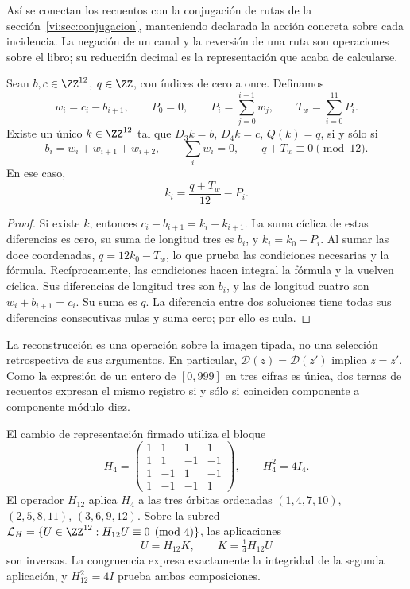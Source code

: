 Así se conectan los recuentos con la conjugación de rutas de la
sección~\ref{vi:sec:conjugacion}, manteniendo declarada la acción
concreta sobre cada incidencia. La negación de un canal y la reversión
de una ruta son operaciones sobre el libro; su reducción decimal es la
representación que acaba de calcularse.

\begin{proposition}
\label{vi:dep:imagen-integral}
Sean \(b,c\in\ZZ^{12}\), \(q\in\ZZ\), con índices de cero a once.
Definamos
\[
 w_i=c_i-b_{i+1},\qquad P_0=0,\qquad
 P_i=\sum_{j=0}^{i-1}w_j,\qquad T_w=\sum_{i=0}^{11}P_i.
\]
Existe un único \(k\in\ZZ^{12}\) tal que
\(D_3k=b\), \(D_4k=c\), \(Q(k)=q\), si y sólo si
\begin{equation}
 b_i=w_i+w_{i+1}+w_{i+2},\qquad
 \sum_iw_i=0,\qquad q+T_w\equiv0\pmod{12}.
 \label{vi:dep:condiciones-imagen}
\end{equation}
En ese caso,
\begin{equation}
 k_i=\frac{q+T_w}{12}-P_i.
 \label{vi:dep:inversa-incidencial}
\end{equation}
\end{proposition}
\begin{proof}
Si existe \(k\), entonces
\(c_i-b_{i+1}=k_i-k_{i+1}\). La suma cíclica de estas diferencias
es cero, su suma de longitud tres es \(b_i\), y
\(k_i=k_0-P_i\). Al sumar las doce coordenadas,
\(q=12k_0-T_w\), lo que prueba las condiciones necesarias y la fórmula.
Recíprocamente, las condiciones hacen integral la fórmula y la vuelven
cíclica. Sus diferencias de longitud tres son \(b_i\), y las de
longitud cuatro son \(w_i+b_{i+1}=c_i\). Su suma es \(q\).
La diferencia entre dos soluciones tiene todas sus diferencias
consecutivas nulas y suma cero; por ello es nula.
\end{proof}

La reconstrucción es una operación sobre la imagen tipada, no una
selección retrospectiva de sus argumentos. En particular,
\(\mathcal D(z)=\mathcal D(z')\) implica \(z=z'\).
Como la expresión de un entero de \([0,999]\) en tres cifras es única,
dos ternas de recuentos expresan el mismo registro si y sólo si coinciden
componente a componente módulo diez.

El cambio de representación firmado utiliza el bloque
\begin{equation}
 H_4=\begin{pmatrix}
 1&1&1&1\\1&1&-1&-1\\
 1&-1&1&-1\\1&-1&-1&1
 \end{pmatrix},\qquad H_4^2=4I_4.
 \label{vi:dep:hadamard}
\end{equation}
El operador \(H_{12}\) aplica \(H_4\) a las tres órbitas ordenadas
\((1,4,7,10)\), \((2,5,8,11)\), \((3,6,9,12)\).
Sobre la subred
\(\mathcal L_H=\{U\in\ZZ^{12}:H_{12}U\equiv0\pmod4\}\),
las aplicaciones
\begin{equation}
 U=H_{12}K,\qquad K=\tfrac14H_{12}U
 \label{vi:dep:K-reversible}
\end{equation}
son inversas. La congruencia expresa exactamente la integridad de la
segunda aplicación, y \(H_{12}^2=4I\) prueba ambas composiciones.

